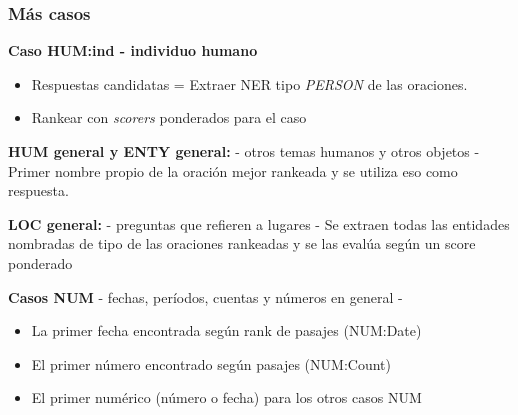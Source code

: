 \begin{frame}
\frametitle{Más casos}

  \textbf{Caso HUM:ind - individuo humano}
  \begin{itemize}
    \item Respuestas candidatas = Extraer NER tipo \textit{PERSON} de las oraciones.
    \item Rankear con \textit{scorers} ponderados para el caso
  \end{itemize}

\textbf{HUM general y ENTY general:} - otros temas humanos y otros objetos - Primer nombre propio de la oración mejor rankeada y se utiliza eso como respuesta. \newline

\textbf{LOC general:} - preguntas que refieren a lugares - Se extraen todas las entidades nombradas de tipo  de las oraciones rankeadas y se las evalúa según un score ponderado \newline


\textbf{Casos NUM} - fechas, períodos, cuentas y números en general -
\begin{itemize}
\item La primer fecha encontrada según rank de pasajes (NUM:Date)
\item El primer número encontrado según pasajes (NUM:Count)
\item El primer numérico (número o fecha) para los otros casos NUM
\end{itemize}


\end{frame}


